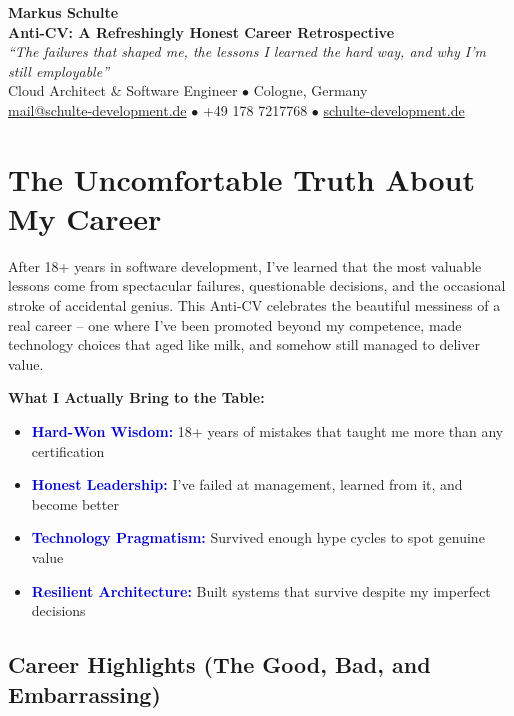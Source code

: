 \documentclass[10pt,a4paper]{article}
\newcommand{\highlight}[1]{\textcolor{mediumblue}{\textbf{#1}}}
\begin{document}
\begin{center}
    {\huge\textbf{\color{darkblue}Markus Schulte}} \\[0.5em]
    {\Large\textbf{Anti-CV: A Refreshingly Honest Career Retrospective}} \\[0.5em]
    \textit{``The failures that shaped me, the lessons I learned the hard way, and why I'm still employable''} \\[0.5em]
    \small Cloud Architect \& Software Engineer $\bullet$ Cologne, Germany \\
    \href{mailto:mail@schulte-development.de}{mail@schulte-development.de} $\bullet$ +49 178 7217768 $\bullet$ \href{https://schulte-development.de}{schulte-development.de}
\end{center}

\section{The Uncomfortable Truth About My Career}

After 18+ years in software development, I've learned that the most valuable lessons come from spectacular failures, questionable decisions, and the occasional stroke of accidental genius. This Anti-CV celebrates the beautiful messiness of a real career -- one where I've been promoted beyond my competence, made technology choices that aged like milk, and somehow still managed to deliver value.

\textbf{What I Actually Bring to the Table:}
\begin{itemize}
    \item \highlight{Hard-Won Wisdom:} 18+ years of mistakes that taught me more than any certification
    \item \highlight{Honest Leadership:} I've failed at management, learned from it, and become better
    \item \highlight{Technology Pragmatism:} Survived enough hype cycles to spot genuine value
    \item \highlight{Resilient Architecture:} Built systems that survive despite my imperfect decisions
\end{itemize}

\subsection{Career Highlights (The Good, Bad, and Embarrassing)}
\end{document}
